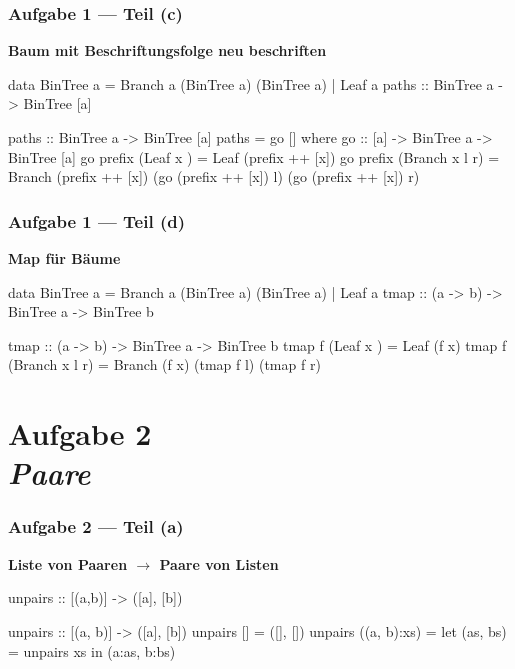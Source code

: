 \documentclass{beamer}
\begin{document}
\begin{frame}[fragile, t] \frametitle{Aufgabe 1 --- Teil (c)}
	\textbf{Baum mit Beschriftungsfolge neu beschriften}
	
	\begin{codebox}
data BinTree a = Branch a (BinTree a) (BinTree a) 
                 | Leaf a
paths :: BinTree a -> BinTree [a]
	\end{codebox}
	
	\bigskip \pause
	
	\begin{codebox}
paths :: BinTree a -> BinTree [a]
paths = go []
  where
      go :: [a] -> BinTree a -> BinTree [a]
      go prefix (Leaf   x    ) = Leaf   (prefix ++ [x])
      go prefix (Branch x l r) 
      	= Branch (prefix ++ [x]) 
      	    (go (prefix ++ [x]) l) 
      	    (go (prefix ++ [x]) r)
	\end{codebox}
\end{frame}


\begin{frame}[fragile, t] \frametitle{Aufgabe 1 --- Teil (d)}
	\textbf{Map für Bäume}
	
	\begin{codebox}
data BinTree a = Branch a (BinTree a) (BinTree a) 
                 | Leaf a
tmap :: (a -> b) -> BinTree a -> BinTree b
	\end{codebox}
	
	\bigskip \pause
	
	\begin{codebox}
tmap :: (a -> b) -> BinTree a -> BinTree b
tmap f (Leaf   x    ) = Leaf   (f x)
tmap f (Branch x l r) = Branch (f x) (tmap f l) (tmap f r)
	\end{codebox}
\end{frame}

\section{Aufgabe 2 \\ \textit{\normalsize Paare}}

\begin{frame}[fragile, t] \frametitle{Aufgabe 2 --- Teil (a)}
	\textbf{Liste von Paaren $\to$ Paare von Listen}
	
	\begin{codebox}
unpairs :: [(a,b)] -> ([a], [b])
	\end{codebox}
	
	\bigskip \pause
	
	\begin{codebox}
unpairs :: [(a, b)] -> ([a], [b])
unpairs []          = ([], [])
unpairs ((a, b):xs) = let (as, bs) = unpairs xs
                      in (a:as, b:bs)
	\end{codebox}
\end{frame}
\end{document}
